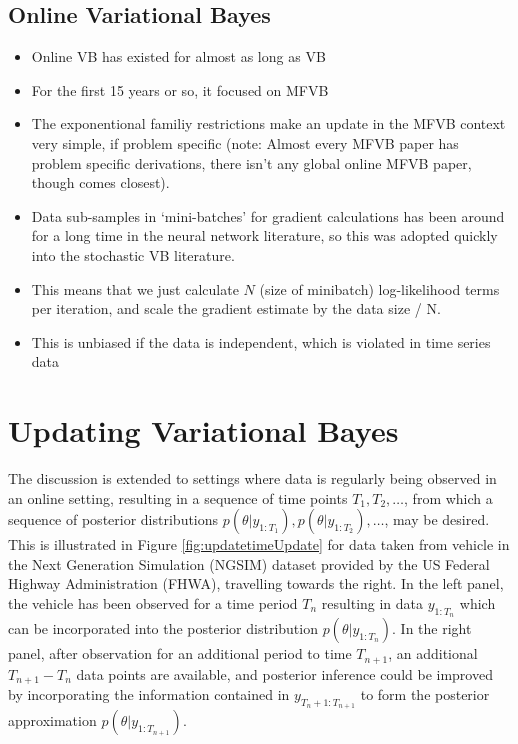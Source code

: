 \documentclass[12pt,a4paper]{article}\usepackage[]{graphicx}\usepackage[]{color}
\begin{document}
\subsection{Online Variational Bayes}
\label{subsec:OnlineVB}
\begin{itemize}
\item Online VB has existed for almost as long as VB
\item For the first 15 years or so, it focused on MFVB
\item The exponentional familiy restrictions make an update in the MFVB context very simple, if problem specific (note: Almost every MFVB paper has problem specific derivations, there isn't any global online MFVB paper, though \cite{Broderick2013} comes closest).
\item Data sub-samples in `mini-batches' for gradient calculations has been around for a long time in the neural network literature, so this was adopted quickly into the stochastic VB literature.
\item This means that we just calculate $N$ (size of minibatch) log-likelihood terms per iteration, and scale the gradient estimate by the data size / N.
\item This is unbiased if the data is independent, which is violated in time series data
\end{itemize}

\section{Updating Variational Bayes}
\label{sec:UVB}

The discussion is extended to settings where data is regularly being observed in an online setting, resulting in a sequence of time points $T_1, T_2, \ldots$, from which a sequence of posterior distributions $p(\theta | y_{1:T_1}), p(\theta | y_{1:T_2}), \ldots$, may be desired.
\\

This is illustrated in Figure \ref{fig:updatetimeUpdate} for data taken from vehicle in the Next Generation Simulation (NGSIM) dataset provided by the US Federal Highway Administration (FHWA), travelling towards the right. In the left panel, the vehicle has been observed for a time period $T_{n}$ resulting in data $y_{1:T_{n}}$ which can be incorporated into the posterior distribution $p(\theta | y_{1:T_{n}})$. In the right panel, after observation for an additional period to time $T_{n+1}$, an additional $T_{n+1} - T_{n}$ data points are available, and posterior inference could be improved by incorporating the information contained in $y_{T_{n}+1:T_{n+1}}$ to form the posterior approximation $p(\theta | y_{1:T_{n+1}})$.
\end{document}
